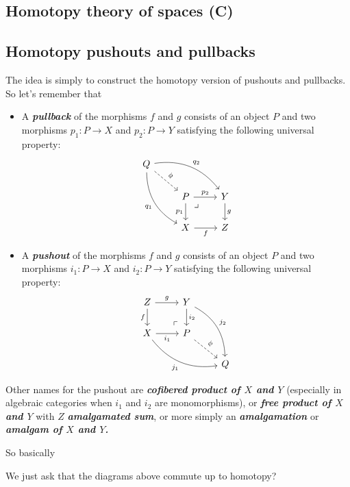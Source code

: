 \begin{remark}
\section{Homotopy theory of spaces (C)}

\subsection{Homotopy pushouts and pullbacks}
The idea is simply to construct the homotopy version of pushouts and pullbacks. So let's remember that
\begin{definition}\leavevmode 
	\begin{itemize}
		\item A \textbf{\textit{pullback}} of the morphisms $f$ and $g$ consists of an object $P$ and two morphisms $p_1:P\to X$ and $p_2:P\to Y$ satisfying the following universal property:
		\[\begin{tikzcd}
			Q\arrow[rrd,bend left,"q_2"]\arrow[ddr,"q_1",swap,bend right]\arrow[dr,dashed,"\phi"]\\
			&P\arrow[r,"p_2"] \arrow[rd, phantom, "\lrcorner", very near start]\arrow[d,"p_1",swap]&Y\arrow[d,"g"]\\
			&X\arrow[r,"f",swap]&Z
		\end{tikzcd}\]
		\item A \textbf{\textit{pushout}} of the morphisms $f$ and $g$ consists of an object $P$ and two morphisms $i_1:P\to X$ and $i_2:P\to Y$ satisfying the following universal property:
		\[\begin{tikzcd}
			Z\arrow[r,"g"]\arrow[d,swap,"f"]&Y\arrow[d,"i_2"]\arrow[ddr,bend left,"j_2"]\\
			X\arrow[r,"i_1",swap]\arrow[drr,bend right,swap,"j_1"]&P\arrow[ul, phantom, "\ulcorner", very near start]\arrow[dr,dashed,"\phi"]\\
			&&Q
		\end{tikzcd}\]
	\end{itemize}
		\begin{remark}
			Other names for the pushout are \textbf{\textit{cofibered product of $X$ and $Y$}} (especially in algebraic categories when $i_1$ and $i_2$ are monomorphisms), or \textbf{\textit{free product of $X$ and $Y$}} with $Z$ \textbf{\textit{amalgamated sum}}, or more simply an \textbf{\textit{amalgamation}} or \textbf{\textit{amalgam of $X$ and $Y$.}}
		\end{remark}
So basically
\begin{definition}
	{\color{magenta}We just ask that the diagrams above commute up to homotopy?}

\end{definition}
\end{definition}
\end{remark}
